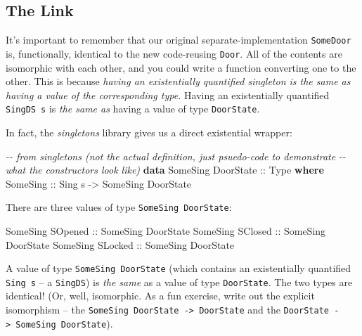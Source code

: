 \documentclass[]{article}
\newenvironment{Shaded}{}{}
\newcommand{\CommentTok}[1]{\textcolor[rgb]{0.38,0.63,0.69}{\textit{#1}}}
\newcommand{\DataTypeTok}[1]{\textcolor[rgb]{0.56,0.13,0.00}{#1}}
\newcommand{\KeywordTok}[1]{\textcolor[rgb]{0.00,0.44,0.13}{\textbf{#1}}}
\newcommand{\NormalTok}[1]{#1}
\newcommand{\OtherTok}[1]{\textcolor[rgb]{0.00,0.44,0.13}{#1}}
\begin{document}
\hypertarget{the-link}{%
\subsection{The Link}\label{the-link}}

It's important to remember that our original separate-implementation
\texttt{SomeDoor} is, functionally, identical to the new code-reusing
\texttt{Door}. All of the contents are isomorphic with each other, and you could
write a function converting one to the other. This is because \emph{having an
existentially quantified singleton is the same as having a value of the
corresponding type.} Having an existentially quantified \texttt{SingDS\ s} is
\emph{the same as} having a value of type \texttt{DoorState}.

In fact, the \emph{singletons} library gives us a direct existential wrapper:

\begin{Shaded}
\begin{Highlighting}[]
\CommentTok{{-}{-} from singletons (not the actual definition, just psuedo{-}code to demonstrate}
\CommentTok{{-}{-} what the constructors look like)}
\KeywordTok{data} \DataTypeTok{SomeSing} \DataTypeTok{DoorState}\OtherTok{ ::} \DataTypeTok{Type} \KeywordTok{where}
    \DataTypeTok{SomeSing}\OtherTok{ ::} \DataTypeTok{Sing}\NormalTok{ s }\OtherTok{{-}>} \DataTypeTok{SomeSing} \DataTypeTok{DoorState}
\end{Highlighting}
\end{Shaded}

There are three values of type \texttt{SomeSing\ DoorState}:

\begin{Shaded}
\begin{Highlighting}[]
\DataTypeTok{SomeSing} \DataTypeTok{SOpened}\OtherTok{ ::} \DataTypeTok{SomeSing} \DataTypeTok{DoorState}
\DataTypeTok{SomeSing} \DataTypeTok{SClosed}\OtherTok{ ::} \DataTypeTok{SomeSing} \DataTypeTok{DoorState}
\DataTypeTok{SomeSing} \DataTypeTok{SLocked}\OtherTok{ ::} \DataTypeTok{SomeSing} \DataTypeTok{DoorState}
\end{Highlighting}
\end{Shaded}

A value of type \texttt{SomeSing\ DoorState} (which contains an existentially
quantified \texttt{Sing\ s} -- a \texttt{SingDS}) is \emph{the same} as a value
of type \texttt{DoorState}. The two types are identical! (Or, well, isomorphic.
As a fun exercise, write out the explicit isomorphism -- the
\texttt{SomeSing\ DoorState\ -\textgreater{}\ DoorState} and the
\texttt{DoorState\ -\textgreater{}\ SomeSing\ DoorState}).
\end{document}
